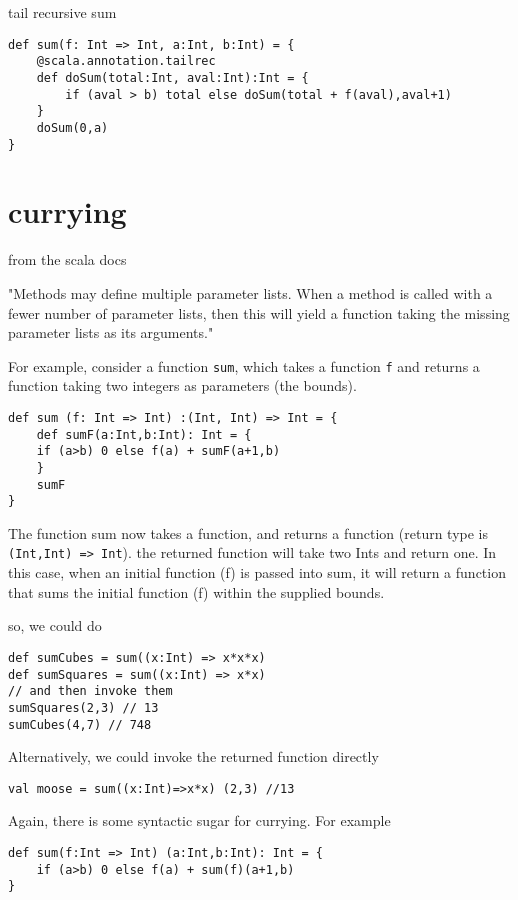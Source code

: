 tail recursive sum
\begin{lstlisting}
def sum(f: Int => Int, a:Int, b:Int) = {
    @scala.annotation.tailrec
    def doSum(total:Int, aval:Int):Int = {
        if (aval > b) total else doSum(total + f(aval),aval+1)
    }
    doSum(0,a)
}
\end{lstlisting}

\chapter{currying}
from the scala docs 
\begin{displayquote}
"Methods may define multiple parameter lists. When a method is called with a fewer number of parameter lists, then this will yield a function taking the missing parameter lists as its arguments."
\end{displayquote}

For example, consider a function \verb|sum|, which takes a function \verb|f| and returns a function taking two integers as parameters (the bounds). 
\begin{lstlisting}
def sum (f: Int => Int) :(Int, Int) => Int = {
    def sumF(a:Int,b:Int): Int = {
    if (a>b) 0 else f(a) + sumF(a+1,b)
    }
    sumF
}
\end{lstlisting}

The function sum now takes a function, and returns a function (return type is \lstinline{(Int,Int) => Int}). the returned function will take two Ints and return one. In this case, when an initial function (f) is passed into sum, it will return a function that sums the initial function (f) within the supplied bounds.

so, we could do
\begin{lstlisting}
def sumCubes = sum((x:Int) => x*x*x)
def sumSquares = sum((x:Int) => x*x)
// and then invoke them
sumSquares(2,3) // 13
sumCubes(4,7) // 748
\end{lstlisting}

Alternatively, we could invoke the returned function directly
\begin{lstlisting}
val moose = sum((x:Int)=>x*x) (2,3) //13
\end{lstlisting}

Again, there is some syntactic sugar for currying. For example
\begin{lstlisting}
def sum(f:Int => Int) (a:Int,b:Int): Int = {
    if (a>b) 0 else f(a) + sum(f)(a+1,b)
}
\end{lstlisting}

